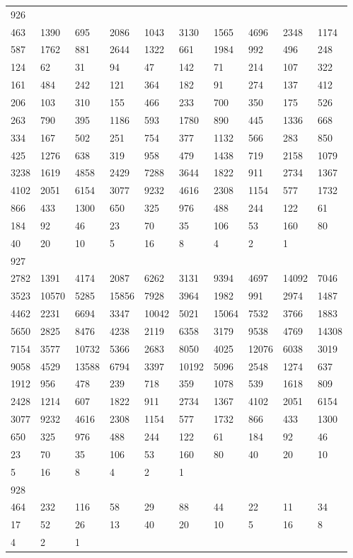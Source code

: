 \begin{longtable}{*{10}{l}}
926&&&&&&&&&\\
463& 1390& 695& 2086& 1043& 3130& 1565& 4696& 2348& 1174\\
587& 1762& 881& 2644& 1322& 661& 1984& 992& 496& 248\\
124& 62& 31& 94& 47& 142& 71& 214& 107& 322\\
161& 484& 242& 121& 364& 182& 91& 274& 137& 412\\
206& 103& 310& 155& 466& 233& 700& 350& 175& 526\\
263& 790& 395& 1186& 593& 1780& 890& 445& 1336& 668\\
334& 167& 502& 251& 754& 377& 1132& 566& 283& 850\\
425& 1276& 638& 319& 958& 479& 1438& 719& 2158& 1079\\
3238& 1619& 4858& 2429& 7288& 3644& 1822& 911& 2734& 1367\\
4102& 2051& 6154& 3077& 9232& 4616& 2308& 1154& 577& 1732\\
866& 433& 1300& 650& 325& 976& 488& 244& 122& 61\\
184& 92& 46& 23& 70& 35& 106& 53& 160& 80\\
40& 20& 10& 5& 16& 8& 4& 2& 1& \\

927&&&&&&&&&\\
2782& 1391& 4174& 2087& 6262& 3131& 9394& 4697& 14092& 7046\\
3523& 10570& 5285& 15856& 7928& 3964& 1982& 991& 2974& 1487\\
4462& 2231& 6694& 3347& 10042& 5021& 15064& 7532& 3766& 1883\\
5650& 2825& 8476& 4238& 2119& 6358& 3179& 9538& 4769& 14308\\
7154& 3577& 10732& 5366& 2683& 8050& 4025& 12076& 6038& 3019\\
9058& 4529& 13588& 6794& 3397& 10192& 5096& 2548& 1274& 637\\
1912& 956& 478& 239& 718& 359& 1078& 539& 1618& 809\\
2428& 1214& 607& 1822& 911& 2734& 1367& 4102& 2051& 6154\\
3077& 9232& 4616& 2308& 1154& 577& 1732& 866& 433& 1300\\
650& 325& 976& 488& 244& 122& 61& 184& 92& 46\\
23& 70& 35& 106& 53& 160& 80& 40& 20& 10\\
5& 16& 8& 4& 2& 1& \\

928&&&&&&&&&\\
464& 232& 116& 58& 29& 88& 44& 22& 11& 34\\
17& 52& 26& 13& 40& 20& 10& 5& 16& 8\\
4& 2& 1& \\


\end{longtable}
